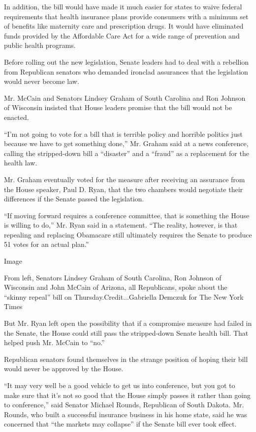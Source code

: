 In addition, the bill would have made it much easier for states to waive
federal requirements that health insurance plans provide consumers with
a minimum set of benefits like maternity care and prescription drugs. It
would have eliminated funds provided by the Affordable Care Act for a
wide range of prevention and public health programs.

Before rolling out the new legislation, Senate leaders had to deal with
a rebellion from Republican senators who demanded ironclad assurances
that the legislation would never become law.

Mr. McCain and Senators Lindsey Graham of South Carolina and Ron Johnson
of Wisconsin insisted that House leaders promise that the bill would not
be enacted.

``I'm not going to vote for a bill that is terrible policy and horrible
politics just because we have to get something done,'' Mr. Graham said
at a news conference, calling the stripped-down bill a ``disaster'' and
a ``fraud'' as a replacement for the health law.

Mr. Graham eventually voted for the measure after receiving an assurance
from the House speaker, Paul D. Ryan, that the two chambers would
negotiate their differences if the Senate passed the legislation.

``If moving forward requires a conference committee, that is something
the House is willing to do,'' Mr. Ryan said in a statement. ``The
reality, however, is that repealing and replacing Obamacare still
ultimately requires the Senate to produce 51 votes for an actual plan.''

Image

From left, Senators Lindsey Graham of South Carolina, Ron Johnson of
Wisconsin and John McCain of Arizona, all Republicans, spoke about the
``skinny repeal'' bill on Thursday.Credit...Gabriella Demczuk for The
New York Times

But Mr. Ryan left open the possibility that if a compromise measure had
failed in the Senate, the House could still pass the stripped-down
Senate health bill. That helped push Mr. McCain to ``no.''

Republican senators found themselves in the strange position of hoping
their bill would never be approved by the House.

``It may very well be a good vehicle to get us into conference, but you
got to make sure that it's not so good that the House simply passes it
rather than going to conference,'' said Senator Michael Rounds,
Republican of South Dakota. Mr. Rounds, who built a successful insurance
business in his home state, said he was concerned that ``the markets may
collapse'' if the Senate bill ever took effect.

